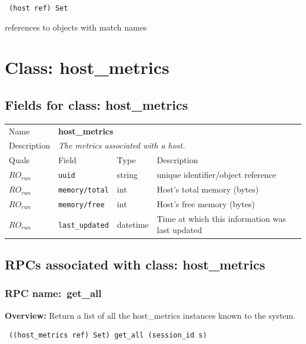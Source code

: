 \vspace{0.3cm}

{\tt 
(host ref) Set
}


references to objects with match names
\vspace{0.3cm}
\vspace{0.3cm}
\vspace{0.3cm}

\vspace{1cm}
\newpage
\section{Class: host\_metrics}
\subsection{Fields for class: host\_metrics}
\begin{longtable}{|lllp{}|}
\hline
\multicolumn{1}{|l}{Name} & \multicolumn{3}{l|}{\bf host\_metrics} \\
\multicolumn{1}{|l}{Description} & \multicolumn{3}{l|}{\parbox{11cm}{\em
The metrics associated with a host.}} \\
\hline
Quals & Field & Type & Description \\
\hline
$\mathit{RO}_\mathit{run}$ &  {\tt uuid} & string & unique identifier/object reference \\
$\mathit{RO}_\mathit{run}$ &  {\tt memory/total} & int & Host's total memory (bytes) \\
$\mathit{RO}_\mathit{run}$ &  {\tt memory/free} & int & Host's free memory (bytes) \\
$\mathit{RO}_\mathit{run}$ &  {\tt last\_updated} & datetime & Time at which this information was last updated \\
\hline
\end{longtable}
\subsection{RPCs associated with class: host\_metrics}
\subsubsection{RPC name:~get\_all}

{\bf Overview:} 
Return a list of all the host\_metrics instances known to the system.

\begin{verbatim} ((host_metrics ref) Set) get_all (session_id s)\end{verbatim}


